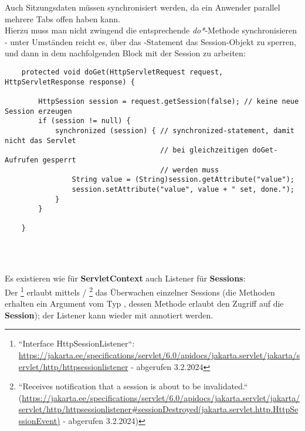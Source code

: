 \begin{tcolorbox}[enlarge top by=0.5cm,enlarge bottom by=0.5cm]
Auch Sitzungsdaten müssen synchronisiert werden, da ein Anwender parallel mehrere Tabs offen haben kann.\\
Hierzu muss man nicht zwingend die entsprechende \textit{do*}-Methode synchronisieren - unter Umständen reicht es, über das -Statement das Session-Objekt zu sperren, und dann in dem nachfolgenden Block mit der Session zu arbeiten:

\begin{verbatim}
    protected void doGet(HttpServletRequest request, HttpServletResponse response) {

        HttpSession session = request.getSession(false); // keine neue Session erzeugen
        if (session != null) {
            synchronized (session) { // synchronized-statement, damit nicht das Servlet
                                     // bei gleichzeitigen doGet-Aufrufen gesperrt
                                     // werden muss
                String value = (String)session.getAttribute("value");
                session.setAttribute("value", value + " set, done.");
            }
        }

    }

\end{verbatim}\\

\end{tcolorbox}\\

\noindent
Es existieren wie für \textbf{ServletContext} auch Listener für \textbf{Sessions}:\\
Der \footnote{
    ``Interface HttpSessionListener``: \url{https://jakarta.ee/specifications/servlet/6.0/apidocs/jakarta.servlet/jakarta/servlet/http/httpsessionlistener} - abgerufen 3.2.2024
} erlaubt mittels  / \footnote{``Receives notification that a session is about to be invalidated.`` (\url{https://jakarta.ee/specifications/servlet/6.0/apidocs/jakarta.servlet/jakarta/servlet/http/httpsessionlistener#sessionDestroyed(jakarta.servlet.http.HttpSessionEvent)} - abgerufen 3.2.2024)} das Überwachen einzelner Sessions (die Methoden erhalten ein Argument vom Typ , dessen Methode  erlaubt den Zugriff auf die \textbf{Session}); der Listener kann wieder mit  annotiert werden.

